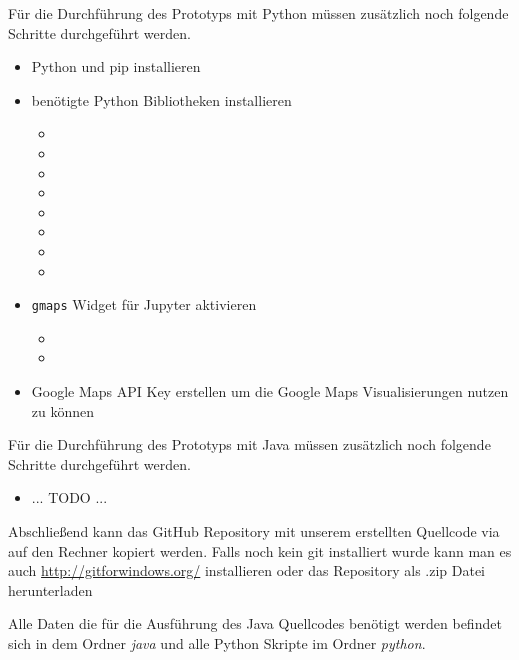 Für die Durchführung des Prototyps mit Python müssen zusätzlich noch folgende Schritte durchgeführt werden.
\begin{itemize}
  \item Python und pip installieren\autocite{Python}
  \item benötigte Python Bibliotheken installieren
  \begin{itemize}
    \item {}
    \item {}
    \item {}
    \item {}
    \item {}
    \item {}
    \item {}
    \item {}
  \end{itemize}
  \item \texttt{gmaps} Widget für Jupyter aktivieren
  \begin{itemize}
    \item {}
    \item {}
  \end{itemize}
  \item Google Maps API Key erstellen um die Google Maps Visualisierungen nutzen zu können
\end{itemize}

Für die Durchführung des Prototyps mit Java müssen zusätzlich noch folgende Schritte durchgeführt werden.
\begin{itemize}
  \item ... TODO ...
\end{itemize}

Abschließend kann das GitHub Repository mit unserem erstellten Quellcode via 
auf den Rechner kopiert werden.
Falls noch kein git installiert wurde kann man es auch \hyperref[hier]{http://gitforwindows.org/} installieren oder das Repository als .zip Datei herunterladen

Alle Daten die für die Ausführung des Java Quellcodes benötigt werden befindet sich in dem Ordner \textit{java}
und alle Python Skripte im Ordner \textit{python}.

